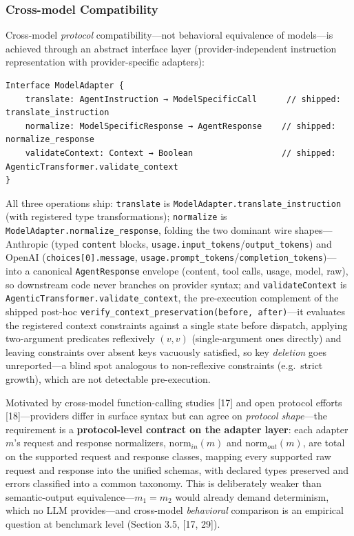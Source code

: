 \documentclass[
  sigconf,
  anonymous]{acmart}
\begin{document}
\subsubsection{Cross-model
Compatibility}\label{cross-model-compatibility}

Cross-model \emph{protocol} compatibility---not behavioral equivalence
of models---is achieved through an abstract interface layer
(provider-independent instruction representation with provider-specific
adapters):

\begin{verbatim}
Interface ModelAdapter {
    translate: AgentInstruction → ModelSpecificCall      // shipped: translate_instruction
    normalize: ModelSpecificResponse → AgentResponse    // shipped: normalize_response
    validateContext: Context → Boolean                  // shipped: AgenticTransformer.validate_context
}
\end{verbatim}

All three operations ship: \texttt{translate} is
\texttt{ModelAdapter.translate\_instruction} (with registered type
transformations); \texttt{normalize} is
\texttt{ModelAdapter.normalize\_response}, folding the two dominant wire
shapes---Anthropic (typed \texttt{content} blocks,
\texttt{usage.input\_tokens}/\texttt{output\_tokens}) and OpenAI
(\texttt{choices{[}0{]}.message},
\texttt{usage.prompt\_tokens}/\texttt{completion\_tokens})---into a
canonical \texttt{AgentResponse} envelope (content, tool calls, usage,
model, raw), so downstream code never branches on provider syntax; and
\texttt{validateContext} is
\texttt{AgenticTransformer.validate\_context}, the pre-execution
complement of the shipped post-hoc
\texttt{verify\_context\_preservation(before,\ after)}---it evaluates
the registered context constraints against a single state before
dispatch, applying two-argument predicates reflexively \((v, v)\)
(single-argument ones directly) and leaving constraints over absent keys
vacuously satisfied, so key \emph{deletion} goes unreported---a blind
spot analogous to non-reflexive constraints (e.g.~strict growth), which
are not detectable pre-execution.

Motivated by cross-model function-calling studies {[}17{]} and open
protocol efforts {[}18{]}---providers differ in surface syntax but can
agree on \emph{protocol shape}---the requirement is a
\textbf{protocol-level contract on the adapter layer}: each adapter
\(m\)'s request and response normalizers, \(\text{norm}_{in}(m)\) and
\(\text{norm}_{out}(m)\), are total on the supported request and
response classes, mapping every supported raw request and response into
the unified schemas, with declared types preserved and errors classified
into a common taxonomy. This is deliberately weaker than semantic-output
equivalence---\(m_1 = m_2\) would already demand determinism, which no
LLM provides---and cross-model \emph{behavioral} comparison is an
empirical question at benchmark level (Section 3.5, {[}17, 29{]}).
\end{document}

